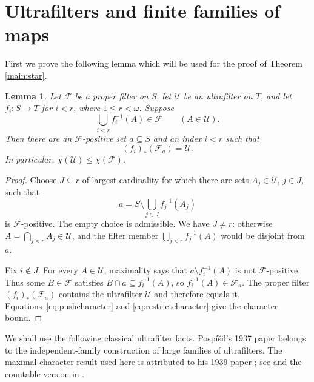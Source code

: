 \documentclass[11pt,a4paper]{amsart}
\newtheorem{lemma}[theorem]{Lemma}
\theoremstyle{definition}
\theoremstyle{remark}
\newcommand{\U}{\mathcal U}
\newcommand{\F}{\mathcal F}
\begin{document}
\section{Ultrafilters and finite families of maps}
First we prove the following lemma which will be used for the proof of Theorem \ref{main:star}.
\begin{lemma}\label{lem:finite}
Let $\F$ be a proper filter on $S$, let $\U$ be an ultrafilter on $T$, and let $f_i:S\to T$ for $i<r$, where $1\leqslant r<\omega$. Suppose
\begin{equation}\label{eq:finiteunion}
\bigcup_{i<r}f_i^{-1}(A)\in\F\qquad(A\in\U).
\end{equation}
Then there are an $\F$-positive set $a\subseteq S$ and an index $i<r$ such that
\[
(f_i)_*(\F_a)=\U.
\]
In particular, $\chi(\U)\leqslant\chi(\F)$.
\end{lemma}
\begin{proof}
Choose $J\subseteq r$ of largest cardinality for which there are sets $A_j\in\U$, $j\in J$, such that
\[
a=S\setminus\bigcup_{j\in J}f_j^{-1}(A_j)
\]
is $\F$-positive. The empty choice is admissible. We have $J\ne r$: otherwise $A=\bigcap_{j<r}A_j\in\U$, and the filter member $\bigcup_{j<r}f_j^{-1}(A)$ would be disjoint from $a$.

Fix $i\notin J$. For every $A\in\U$, maximality says that $a\setminus f_i^{-1}(A)$ is not $\F$-positive. Thus some $B\in\F$ satisfies $B\cap a\subseteq f_i^{-1}(A)$, so $f_i^{-1}(A)\in\F_a$. The proper filter $(f_i)_*(\F_a)$ contains the ultrafilter $\U$ and therefore equals it. Equations~\eqref{eq:pushcharacter} and \eqref{eq:restrictcharacter} give the character bound.
\end{proof}

We shall use the following classical ultrafilter facts. Posp\'i\v{s}il's 1937 paper \cite{Pospisil1937} belongs to the independent-family construction of large families of ultrafilters. The maximal-character result used here is attributed to his 1939 paper \cite{Pospisil1939}; see \cite[Theorem 2.7]{Comfort} and the countable version in \cite{GuzmanHrusak}.
\end{document}

